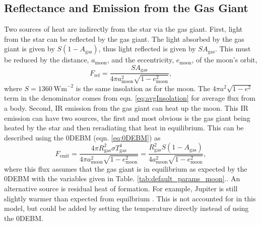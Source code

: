 \documentclass[12pt, onecolumn]{revtex4-2}    %
\newcommand{\flux}{\ensuremath{\ \text{Wm}^{-2}}}
\begin{document}
\subsection{Reflectance and Emission from the Gas Giant} \label{ssec:ref_emiss_gg}
%
Two sources of heat are indirectly from the star via the gas giant.
First, light from the star can be reflected by the gas giant.
The light absorbed by the gas giant is given by $S(1-A_\text{gas})$, thus light reflected is given by $SA_\text{gas}$.
This must be reduced by the distance, $a_\text{moon}$, and the eccentricity, $e_\text{moon}$, of the moon's orbit,
\begin{equation}
  F_\text{ref} = \frac{SA_\text{gas}}{4\pi a_\text{moon}^2 \sqrt{1-e_\text{moon}^2}},
  \label{eq:reflectance_flux}
\end{equation}
where $S = 1360 \flux$ is the same insolation as for the moon.
The $4\pi a^2\sqrt{1-e^2}$ term in the denominator comes from eqn. \eqref{eq:avgInsolation} for average flux from a body. 
Second, IR emission from the gas giant can heat up the moon.
This IR emission can have two sources, the first and most obvious is the gas giant being heated by the star and then reradiating that heat in equilibrium.
This can be described using the 0DEBM (eqn. \eqref{eq:0DEBM}) as 
\begin{equation}
    F_\text{emit} = \frac{4 \pi R_\text{gas}^2 \sigma T_\text{gas}^4}{4\pi a_\text{moon}^2 \sqrt{1-e_\text{moon}^2}}
    = \frac{R_\text{gas}^2 S(1 - A_\text{gas})}{4 a_\text{moon}^2 \sqrt{1-e_\text{moon}^2}},
    \label{eq:emission_flux}
\end{equation}
where this flux assumes that the gas giant is in equilibrium as expected by the 0DEBM with the variables given in Table. \ref{tab:default_params_moon}..
An alternative source is residual heat of formation.
For example, Jupiter is still slightly warmer than expected from equilbrium \cite{LJW2018}.
This is not accounted for in this model, but could be added by setting the temperature directly instead of using the 0DEBM.
\end{document}
